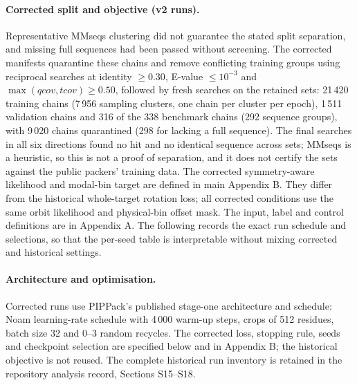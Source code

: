\documentclass[10pt,a4paper]{article}
\begin{document}
\paragraph{Corrected split and objective (v2 runs).} Representative MMseqs
clustering did not guarantee the stated split separation, and missing full
sequences had been passed without screening. The corrected manifests quarantine
these chains and remove conflicting training groups using reciprocal searches
at identity $\geq0.30$, E-value $\leq10^{-3}$ and
$\max(qcov,tcov)\geq0.50$, followed by fresh searches on the retained sets:
21\,420 training chains (7\,956 sampling clusters, one chain per cluster per epoch),
1\,511 validation chains and 316 of the 338 benchmark chains (292 sequence groups),
with 9\,020 chains quarantined (298 for lacking a full sequence). The final searches in
all six directions found no hit and no identical sequence across sets; MMseqs is a
heuristic, so this is not a proof of separation, and it does not certify the sets
against the public packers' training data.
The corrected symmetry-aware likelihood and modal-bin target are defined in main Appendix B. They differ from the historical whole-target rotation loss; all corrected conditions use the same orbit likelihood and physical-bin offset mask. The input, label and control definitions are in Appendix A. The following records the exact run schedule and selections, so that the per-seed table is interpretable without mixing corrected and historical settings.

\paragraph{Architecture and optimisation.} Corrected runs use PIPPack's published stage-one architecture and schedule: Noam learning-rate schedule with 4\,000 warm-up steps, crops of 512 residues, batch size 32 and 0--3 random recycles. The corrected loss, stopping rule, seeds and checkpoint selection are specified below and in Appendix B; the historical objective is not reused. The complete historical run inventory is retained in the repository analysis record, Sections S15--S18.
\end{document}
